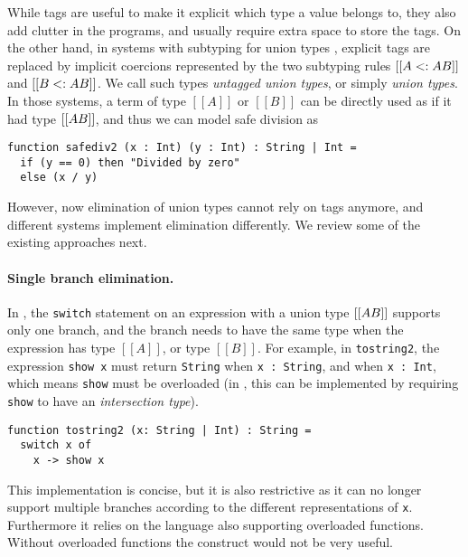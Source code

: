 

While tags are useful to make it explicit which type a value belongs to, they
also add clutter in the programs, and usually require extra space to store the
tags. On the other hand, in systems with subtyping for union types
\cite{dunfield2014elaborating,pierce1991programming,muehlboeck2018empowering},
explicit tags are replaced by implicit coercions represented by the two
subtyping rules $[[A <: A \/ B]]$ and $[[B <: A \/ B]]$. We call such types
\textit{untagged union types}, or simply \textit{union types}. In those systems,
a term of type $[[A]]$ or $[[B]]$ can be directly used as if it had type $[[A \/
B]]$, and thus we can model safe division as

\begin{lstlisting}
function safediv2 (x : Int) (y : Int) : String | Int =
  if (y == 0) then "Divided by zero"
  else (x / y)
\end{lstlisting}

\noindent However, now elimination of union types cannot rely on tags anymore, and
different systems implement elimination differently. We review some of the
existing approaches next.

\paragraph{Single branch elimination.}

In \citet{pierce1991programming,dunfield2014elaborating}, the \lstinline{switch}
statement on an expression with a union type $[[A \/ B]]$ supports only one
branch, and the branch needs to have the same type when the expression has type
$[[A]]$, or type $[[B]]$. For example, in \lstinline{tostring2}, the expression
\lstinline{show x} must return \lstinline{String} when \lstinline{x : String},
and when \lstinline{x : Int}, which means \lstinline{show} must be overloaded
(in \citet{pierce1991programming,dunfield2014elaborating}, this can be
implemented by requiring \lstinline{show} to have an \textit{intersection type}).

\begin{lstlisting}
function tostring2 (x: String | Int) : String =
  switch x of
    x -> show x
\end{lstlisting}

This implementation is concise, but it is also restrictive as it can no longer
support multiple branches according to the different representations of
\lstinline{x}. Furthermore it relies on the language also supporting overloaded
functions. Without overloaded functions the construct would not be very useful.

